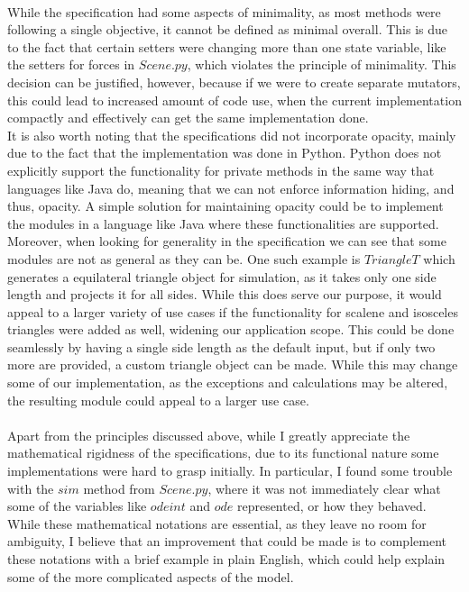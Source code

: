 \documentclass[12pt]{article}
\begin{document}
\\
While the specification had some aspects of minimality, as most methods were following a single objective, it cannot be defined as minimal overall. This is due to the fact that certain setters were changing more than one state variable, like the setters for forces in $Scene.py$, which violates the principle of minimality. This decision can be justified, however, because if we were to create separate mutators, this could lead to increased amount of code use, when the current implementation compactly and effectively can get the same implementation done. \\
It is also worth noting that the specifications did not incorporate opacity, mainly due to the fact that the implementation was done in Python. Python does not explicitly support the functionality for private methods in the same way that languages like Java do, meaning that we can not enforce information hiding, and thus, opacity. A simple solution for maintaining opacity could be to implement the modules in a language like Java where these functionalities are supported. \\
Moreover, when looking for generality in the specification we can see that some modules are not as general as they can be. One such example is $TriangleT$ which generates a equilateral triangle object for simulation, as it takes only one side length and projects it for all sides. While this does serve our purpose, it would appeal to a larger variety of use cases if the functionality for scalene and isosceles triangles were added as well, widening our application scope. This could be done seamlessly by having a single side length as the default input, but if only two more are provided, a custom triangle object can be made. While this may change some of our implementation, as the exceptions and calculations may be altered, the resulting module could appeal to a larger use case.
\\\\
Apart from the principles discussed above, while I greatly appreciate the mathematical rigidness of the specifications, due to its functional nature some implementations were hard to grasp initially. In particular, I found some trouble with the $sim$ method from $Scene.py$, where it was not immediately clear what some of the variables like $odeint$ and $ode$ represented, or how they behaved. While these mathematical notations are essential, as they leave no room for ambiguity, I believe that an improvement that could be made is to complement these notations with a brief example in plain English, which could help explain some of the more complicated aspects of the model.
\end{document}
